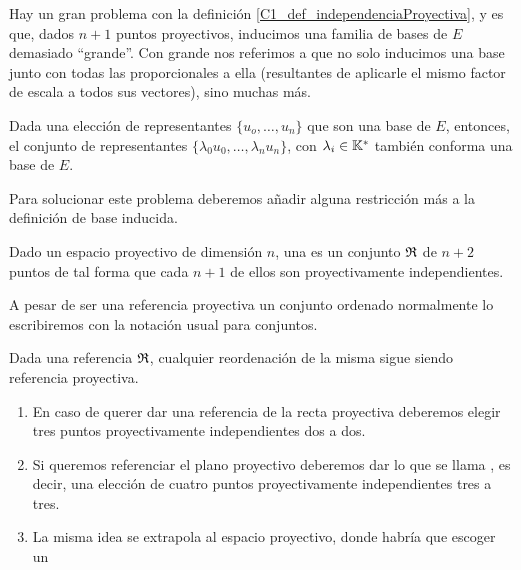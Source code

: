 Hay un gran problema con la definición \ref{C1_def_independenciaProyectiva}, y es que, dados $n+1$ puntos proyectivos, inducimos una familia de bases de $E$ demasiado ``grande''. Con grande nos referimos a que no solo inducimos una base junto con todas las proporcionales a ella (resultantes de aplicarle el mismo factor de escala a todos sus vectores), sino muchas más.
\begin{obs}
	\label{C1_obs_noUnicidadBase}
	Dada una elección de representantes $\{u_o,\dots,u_n\}$ que son una base de $E$, entonces, el conjunto de representantes $\{\lambda_0u_0,\dots,\lambda_nu_n\}$, con $\lambda_i\in\mathbb{K}^*$ también conforma una base de $E$.
\end{obs}

Para solucionar este problema deberemos añadir alguna restricción más a la definición de base inducida.
\begin{defi}
	\label{C1_def_refereciaProyectiva}
	Dado un espacio proyectivo de dimensión $n$, una  es un conjunto  $\mathfrak{R}$ de $n+2$ puntos de tal forma que cada $n+1$ de ellos son proyectivamente independientes. 
\end{defi}

A pesar de ser una referencia proyectiva un conjunto ordenado normalmente lo escribiremos con la notación usual para conjuntos.

\begin{obs}[Reordenación]
	\label{C1_obs_reordenacionReferencias}
	Dada una referencia $\mathfrak{R}$, cualquier reordenación de la misma sigue siendo referencia proyectiva.
\end{obs} 

\begin{exa}
	\label{C1_exa_dimensionesBajas}
	\begin{enumerate}
		\item En caso de querer dar una referencia de la recta proyectiva deberemos elegir tres puntos proyectivamente independientes dos a dos.
		\item Si queremos referenciar el plano proyectivo deberemos dar lo que se llama , es decir, una elección de cuatro puntos proyectivamente independientes tres a tres.
		\item La misma idea se extrapola al espacio proyectivo, donde habría que escoger un 
	\end{enumerate}
\end{exa}
